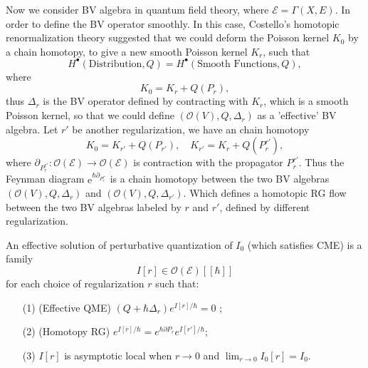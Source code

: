 \documentclass[10pt]{article}
\begin{document}
Now we consider BV algebra in quantum field theory, where $ \mathcal{E} = \Gamma(X,E)$.
In order to define the BV operator smoothly. In this case, Costello's homotopic renormalization theory suggested that we could deform the Poisson kernel $ K_0$ by a chain homotopy, to give a new smooth Poisson kernel $ K_r$, such that
\begin{equation*}
  H^{\bullet}(\text{Distribution}, Q) = H^{\bullet}(\text{Smooth Functions}, Q),
\end{equation*}
where
\begin{equation*}
  K_0 = K_r + Q(P_r),
\end{equation*}
thus $ \Delta_{r}$ is the BV operator defined by contracting with $ K_r$, which is a smooth Poisson kernel, so that we could define $\left( \mathcal{O}(V), Q, \Delta_{r} \right)$ as a 'effective' BV algebra.
Let $ r'$ be another regularization, we have an chain homotopy
\begin{equation*}
  K_0 = K_{r'} + Q(P_{r'}), \quad K_{r'} = K_{r} + Q(P_r^{r'}),
\end{equation*}
where $\partial_{P_{r}^{r'}}: \mathcal{O}(\mathcal{E}) \rightarrow \mathcal{O}(\mathcal{E})$ is contraction with the propagator $ P_{r}^{r'}$.
Thus the Feynman diagram $ \mathrm{e}^{\hbar \partial_{P_{r}^{r'}}}$ is a chain homotopy between the two BV algebras $\left( \mathcal{O}(V), Q, \Delta_{r} \right)$ and $\left( \mathcal{O}(V), Q, \Delta_{r'} \right)$.
Which defines a homotopic RG flow between the two BV algebras labeled by $ r$ and $ r'$, defined by different regularization.
\begin{definition}
  An effective solution of perturbative quantization of $I_0$ (which satisfies CME) is a family
  \begin{equation*}
    I[r] \in \mathcal{O}(\mathcal{E})[[\hbar]]
  \end{equation*}
  for each choice of regularization $r$ such that:
  \begin{itemize}
    \item[(1)] (Effective QME) $(Q + \hbar\Delta_r) e^{I[r]/\hbar} = 0$ ;
    \item[(2)] (Homotopy RG) $e^{I[r]/\hbar} = e^{\hbar \partial P_r} e^{I[r']/\hbar}$;
    \item[(3)] $I[r]$ is asymptotic local when $r \to 0$ and $ \lim_{r \to 0} I_0[r] = I_0. $
  \end{itemize}
\end{definition}
\end{document}
